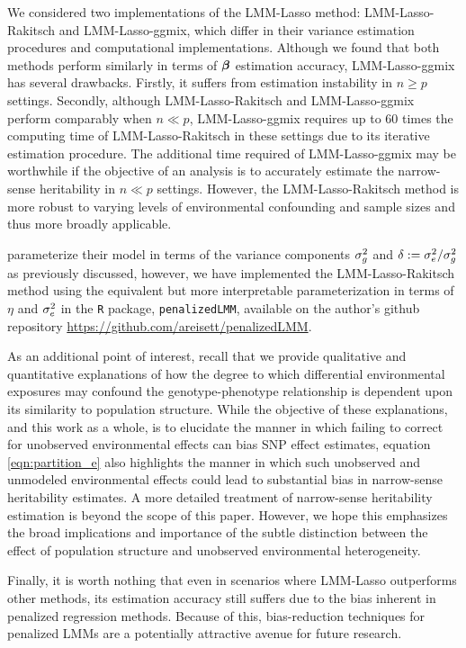 We considered two implementations of the LMM-Lasso method: LMM-Lasso-Rakitsch and LMM-Lasso-ggmix, which differ in their variance estimation procedures and computational implementations. Although we found that both methods perform similarly in terms of $\boldsymbol{\beta}{}$ estimation accuracy, LMM-Lasso-ggmix has several drawbacks. Firstly, it suffers from estimation instability in $n \ge p$ settings. Secondly, although LMM-Lasso-Rakitsch and LMM-Lasso-ggmix perform comparably when $n \ll p$, LMM-Lasso-ggmix requires up to 60 times the computing time of LMM-Lasso-Rakitsch in these settings due to its iterative estimation procedure. The additional time required of LMM-Lasso-ggmix may be worthwhile if the objective of an analysis is to accurately estimate the narrow-sense heritability in $n \ll p$ settings. However, the LMM-Lasso-Rakitsch method is more robust to varying levels of environmental confounding and sample sizes and thus more broadly applicable. 

\citet{Rakitsch2012} parameterize their model in terms of the variance components $\sigma^2_g$ and $\delta := \sigma^2_e / \sigma^2_g$ as previously discussed, however, we have implemented the LMM-Lasso-Rakitsch method using the equivalent but more interpretable parameterization in terms of $\eta$ and $\sigma^2_e$ in the \texttt{R} package, \texttt{penalizedLMM}, available on the author's github repository \url{https://github.com/areisett/penalizedLMM}.

As an additional point of interest, recall that we provide qualitative and quantitative explanations of how the degree to which differential environmental exposures may confound the genotype-phenotype relationship is dependent upon its similarity to population structure. While the objective of these explanations, and this work as a whole, is to elucidate the manner in which failing to correct for unobserved environmental effects can bias SNP effect estimates, equation \eqref{eqn:partition_e} also highlights the manner in which such unobserved and unmodeled environmental effects could lead to substantial bias in narrow-sense heritability estimates. A more detailed treatment of narrow-sense heritability estimation is beyond the scope of this paper. However, we hope this emphasizes the broad implications and importance of the subtle distinction between the effect of population structure and unobserved environmental heterogeneity. 

Finally, it is worth nothing that even in scenarios where LMM-Lasso outperforms other methods, its estimation accuracy still suffers due to the bias inherent in penalized regression methods. Because of this, bias-reduction techniques for penalized LMMs are a potentially attractive avenue for future research.
